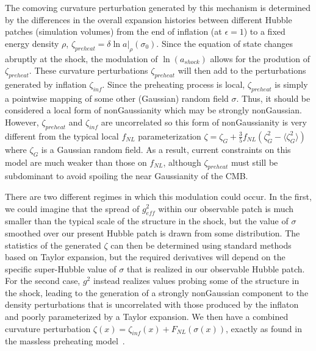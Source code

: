 \documentclass[11pt,a4paper]{article}
\begin{document}
The comoving curvature perturbation generated by this mechanism is determined by the differences in the overall expansion histories between different Hubble patches (simulation volumes) from the end of inflation (at $\epsilon = 1$) to a fixed energy density $\rho$, $\zeta_{preheat} = \delta\ln a|_\rho(\sigma_0)$.
Since the equation of state changes abruptly at the shock, the modulation of $\ln(a_{shock})$ allows for the prodution of $\zeta_{preheat}$.
These curvature perturbations $\zeta_{preheat}$ will then add to the perturbations generated by inflation $\zeta_{inf}$.
Since the preheating process is local, $\zeta_{preheat}$ is simply a pointwise mapping of some other (Gaussian) random field $\sigma$.
Thus, it should be considered a local form of nonGaussianity which may be strongly nonGaussian.
However, $\zeta_{preheat}$ and $\zeta_{inf}$ are uncorrelated so this form of nonGaussianity is very different from the typical local $f_{NL}$ parameterization $\zeta = \zeta_{G} + \frac{3}{5}f_{NL}(\zeta_{G}^2-\langle\zeta_{G}^2\rangle)$ where $\zeta_{G}$ is a Gaussian random field.
As a result, current constraints on this model are much weaker than those on $f_{NL}$, although $\zeta_{preheat}$ must still be subdominant to avoid spoiling the near Gaussianity of the CMB.

There are two different regimes in which this modulation could occur.
In the first, we could imagine that the spread of $g_{eff}^2$ within our observable patch is much smaller than the typical scale of the structure in the shock, but the value of $\sigma$ smoothed over our present Hubble patch is drawn from some distribution.
The statistics of the generated $\zeta$ can then be determined using standard methods based on Taylor expansion, but the required derivatives will depend on the specific super-Hubble value of $\sigma$ that is realized in our observable Hubble patch.
For the second case, $g^2$ instead realizes values probing some of the structure in the shock, leading to the generation of a strongly nonGaussian component to the density perturbations that is uncorrelated with those produced by the inflaton and poorly parameterized by a Taylor expansion.
We then have a combined curvature perturbation $\zeta(x) = \zeta_{inf}(x) + F_{NL}(\sigma(x))$, exactly as found in the massless preheating model~\cite{Bond:2009xx}.

\end{document}
